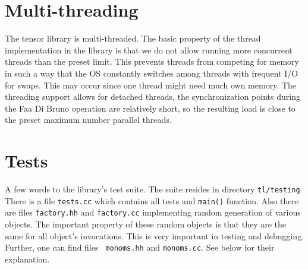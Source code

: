 \documentclass[11pt,a4paper]{article}
\begin{document}
\section{Multi-threading}

The tensor library is multi-threaded. The basic property of the
thread implementation in the library is that we do not allow running
more concurrent threads than the preset limit. This prevents threads
from competing for memory in such a way that the OS constantly switches
among threads with frequent I/O for swaps. This may occur since one
thread might need much own memory. The threading support allows for
detached threads, the synchronization points during the Faa Di Bruno
operation are relatively short, so the resulting load is close to the
preset maximum number parallel threads.

\section{Tests}

A few words to the library's test suite. The suite resides in
directory {\tt tl/testing}. There is a file {\tt tests.cc} which
contains all tests and {\tt main()} function. Also there are files
{\tt factory.hh} and {\tt factory.cc} implementing random generation
of various objects. The important property of these random objects is
that they are the same for all object's invocations. This is very
important in testing and debugging. Further, one can find files {\tt
monoms.hh} and {\tt monoms.cc}. See below for their explanation.
\end{document}
